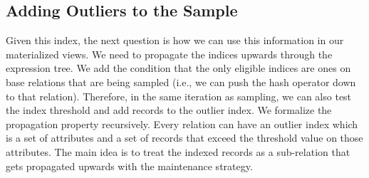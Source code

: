 
\subsection{Adding Outliers to the Sample}
Given this index, the next question is how we can use this information in our materialized views.
We need to propagate the indices upwards through the expression tree.
We add the condition that the only eligible indices are ones on base relations that are being sampled (i.e., we can push the hash operator down to that relation).
Therefore, in the same iteration as sampling, we can also test the index threshold and add records to the outlier index. 
We formalize the propagation property recursively. 
Every relation can have an outlier index which is a set of attributes and a set of records that exceed the threshold value on those attributes.
The main idea is to treat the indexed records as a sub-relation that gets propagated upwards with the maintenance strategy.
